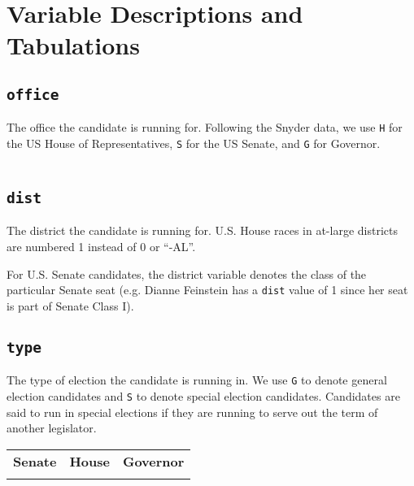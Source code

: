 \documentclass[12pt]{article}
\begin{document}
\section{Variable Descriptions and Tabulations}



\subsection*{\texttt{office}}

The office the candidate is running for. Following the Snyder data, we use \texttt{H} for the US House of Representatives, \texttt{S} for the US Senate, and \texttt{G} for Governor.


    \begin{tabularx}{\linewidth}{C}
    
    \end{tabularx}

\subsection*{\texttt{dist}}

The district the candidate is running for. U.S. House races in at-large districts are numbered 1 instead of 0 or ``-AL''.

 For U.S. Senate candidates, the district variable denotes the class of the particular Senate seat (e.g. Dianne Feinstein has a \texttt{dist} value of 1 since her seat is part of Senate Class I).

\begin{table}[!h]
\centering
\footnotesize

\end{table}





\subsection*{\texttt{type}}

The type of election the candidate is running in. We use \texttt{G} to denote general election candidates and \texttt{S} to denote special election candidates. Candidates are said to run in special elections if they are running to serve out the term of another legislator.
\begin{table}[!h]
\begin{tabularx}{\linewidth}{CCC}
    \textbf{Senate} & \textbf{House} & \textbf{Governor}\\
     &  & 
\end{tabularx}
\end{table}
\end{document}
